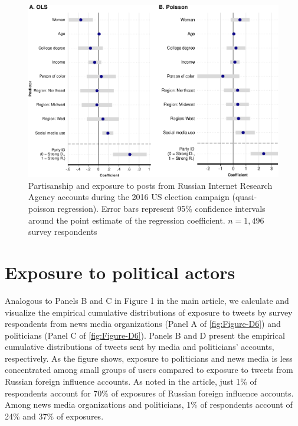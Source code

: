 \documentclass[
  12pt,
]{article}
\begin{document}
\begin{figure}[h]

{\centering \includegraphics[width=1\linewidth,height=0.6\textheight]{Appendix_files/figure-latex/Figure-C5-1} 

}

\caption{Partisanship and exposure to posts from Russian Internet Research Agency accounts during the 2016 US election campaign (quasi-poisson regression). Error bars represent 95\% confidence intervals around the point estimate of the regression coefficient. $n = 1,496$ survey respondents}\label{fig:Figure-C5}
\end{figure}

\clearpage

\hypertarget{exposure-to-political-actors}{%
\section{Exposure to political actors}\label{exposure-to-political-actors}}

Analogous to Panels B and C in Figure 1 in the main article, we calculate and visualize the empirical cumulative distributions of exposure to tweets by survey respondents from news media organizations (Panel A of \autoref{fig:Figure-D6}) and politicians (Panel C of \autoref{fig:Figure-D6}). Panels B and D present the empirical cumulative distributions of tweets sent by media and politicians' accounts, respectively. As the figure shows, exposure to politicians and news media is less concentrated among small groups of users compared to exposure to tweets from Russian foreign influence accounts. As noted in the article, just 1\% of respondents account for 70\% of exposures of Russian foreign influence accounts. Among news media organizations and politicians, 1\% of respondents account of 24\% and 37\% of exposures.
\end{document}

